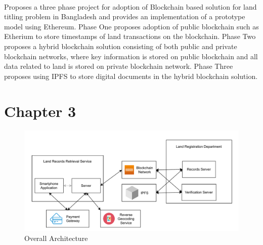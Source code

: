 \documentclass{article}
\begin{document}
        \paragraph{}
        \cite{ALAM2020} Proposes a three phase project for adoption of Blockchain based solution for land titling problem in Bangladesh and provides an implementation of a prototype model using Ethereum. Phase One proposes adoption of public blockchain such as Etherium to store timestamps of land transactions on the blockchain. Phase Two proposes a hybrid blockchain solution consisting of both public and private blockchain networks, where key information is stored on public blockchain and all data related to land is stored on private blockchain network. Phase Three proposes using IPFS to store digital documents in the hybrid blockchain solution.



\section{Chapter 3}
    \paragraph{}
    \begin{figure}[htbp]
        \includegraphics[scale=0.25]{hld}
        \centering
        \caption{Overall Architecture}
        \label{fig:hld}
    \end{figure}
\end{document}
